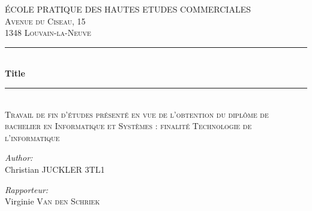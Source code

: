 \begin{titlepage}
\newcommand{\HRule}{\rule{\linewidth}{0.5mm}} %

\center %
 

\textsc{\LARGE ÉCOLE PRATIQUE DES HAUTES ETUDES COMMERCIALES}\\[1.5cm] %


 

\textsc{\large Avenue du Ciseau, 15}\\[0.5cm] %
\textsc{\large 1348 Louvain-la-Neuve}\\[0.5cm] %


\HRule \\[0.4cm]
{ \huge \bfseries Title}\\[0.4cm] %
\HRule \\[0.4cm]
\textsc{Travail de fin d'études présenté en vue de l'obtention du diplôme de bachelier en Informatique et Systèmes : finalité Technologie de l'informatique}\\[1.5cm] %
 

\begin{minipage}{0.4\textwidth}
\begin{flushleft} \large
\emph{Author:}\\
Christian \textsc{JUCKLER} 3TL1 %
\end{flushleft}
\end{minipage}
\begin{minipage}{0.4\textwidth}
\begin{flushleft} \large
\emph{Rapporteur:} \\
Virginie \textsc{Van den Schriek} %
\end{flushleft}
\end{minipage}\\[4cm]



\end{titlepage}
